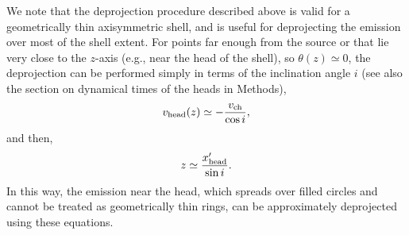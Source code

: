 \documentclass[12pt]{mythesis}
\begin{document}
We note that the deprojection procedure described above is valid for a geometrically thin axisymmetric shell, and is useful for deprojecting the emission over most of the shell extent. For points far enough from the source or that lie very close to the $z$-axis (e.g., near the head of the shell), so $\theta(z)\simeq 0$, the deprojection can be performed simply in terms of the inclination angle $i$ (see also the section on dynamical times of the heads in Methods),
\begin{equation}
	v_{\rm head}(z) \simeq -\frac{v_\mathrm{ch}}{\cos i}, 
\end{equation}
and then,
\begin{equation}
	z \simeq \frac{x'_{\rm head}}{\sin i}.
\end{equation}
In this way, the emission near the head, which spreads over filled circles and cannot be treated as geometrically thin rings, can be approximately deprojected using these equations.
\end{document}
